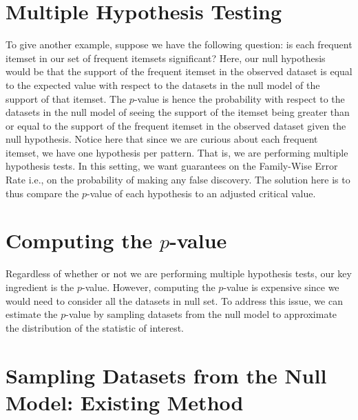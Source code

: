 \documentclass{article}
\begin{document}
\section*{Multiple Hypothesis Testing}

To give another example, suppose we have the following question: is each
frequent itemset in our set of frequent itemsets significant? Here, our null
hypothesis would be that the support of the frequent itemset in the observed
dataset is equal to the expected value with respect to the datasets in the null
model of the support of that itemset. The $p$-value is hence the probability
with respect to the datasets in the null model of seeing the support of the
itemset being greater than or equal to the support of the frequent itemset in
the observed dataset given the null hypothesis. Notice here that since we are
curious about each frequent itemset, we have one hypothesis per pattern. That
is, we are performing multiple hypothesis tests. In this setting, we want
guarantees on the Family-Wise Error Rate i.e., on the probability of making any
false discovery. The solution here is to thus compare the $p$-value of each
hypothesis to an adjusted critical value.

\section*{Computing the $p$-value}

Regardless of whether or not we are performing multiple hypothesis tests, our
key ingredient is the $p$-value. However, computing the $p$-value is expensive
since we would need to consider all the datasets in null set. To address this
issue, we can estimate the $p$-value by sampling datasets from the null model to
approximate the distribution of the statistic of interest.

\section*{Sampling Datasets from the Null Model: Existing Method}
\end{document}
